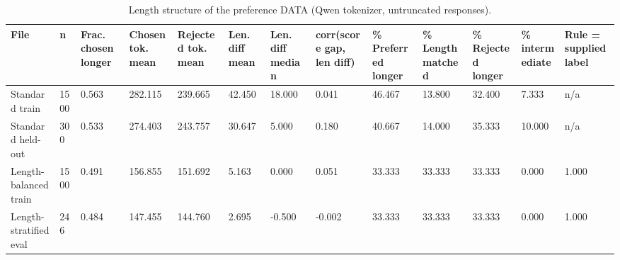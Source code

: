 \begin{table}[t]
\centering
\small
\caption{Length structure of the preference DATA (Qwen tokenizer, untruncated responses).}
\begin{tabular}{lllllllllllll}
\toprule
File & n & Frac. chosen longer & Chosen tok. mean & Rejected tok. mean & Len. diff mean & Len. diff median & corr(score gap, len diff) & \% Preferred longer & \% Length matched & \% Rejected longer & \% intermediate & Rule = supplied label \\
\midrule
Standard train & 1500 & 0.563 & 282.115 & 239.665 & 42.450 & 18.000 & 0.041 & 46.467 & 13.800 & 32.400 & 7.333 & n/a \\
Standard held-out & 300 & 0.533 & 274.403 & 243.757 & 30.647 & 5.000 & 0.180 & 40.667 & 14.000 & 35.333 & 10.000 & n/a \\
Length-balanced train & 1500 & 0.491 & 156.855 & 151.692 & 5.163 & 0.000 & 0.051 & 33.333 & 33.333 & 33.333 & 0.000 & 1.000 \\
Length-stratified eval & 246 & 0.484 & 147.455 & 144.760 & 2.695 & -0.500 & -0.002 & 33.333 & 33.333 & 33.333 & 0.000 & 1.000 \\
\bottomrule
\end{tabular}
\end{table}

